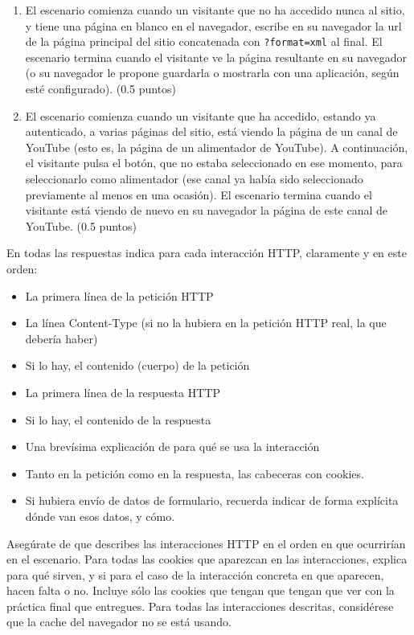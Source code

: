 \begin{enumerate}
\begin{enumerate}
  \item El escenario comienza cuando un visitante que no ha accedido nunca al sitio, y tiene una página en blanco en el navegador, escribe en su navegador la url de la página principal del sitio concatenada con \verb|?format=xml| al final. El escenario termina cuando el visitante ve la página resultante en su navegador (o su navegador le propone guardarla o mostrarla con una aplicación, según esté configurado). (0.5 puntos)

  \item El escenario comienza cuando un visitante que ha accedido, estando ya autenticado, a varias páginas del sitio, está viendo la página de un canal de YouTube (esto es, la página de un alimentador de YouTube). A continuación, el visitante pulsa el botón, que no estaba seleccionado en ese momento, para seleccionarlo como alimentador (ese canal ya había sido seleccionado previamente al menos en una ocasión). El escenario termina cuando el visitante está viendo de nuevo en su navegador la página de este canal de YouTube. (0.5 puntos)

  \end{enumerate}
  
  En todas las respuestas indica para cada interacción HTTP, claramente y en este orden:

\begin{itemize}
  \item La primera línea de la petición HTTP
  \item La línea Content-Type (si no la hubiera en la petición HTTP real, la que debería haber)
  \item Si lo hay, el contenido (cuerpo) de la petición
  \item La primera línea de la respuesta HTTP
  \item Si lo hay, el contenido de la respuesta
  \item Una brevísima explicación de para qué se usa la interacción
  \item Tanto en la petición como en la respuesta, las cabeceras con cookies.
  \item Si hubiera envío de datos de formulario, recuerda indicar de forma explícita dónde van esos datos, y cómo.
  \end{itemize}

Asegúrate de que describes las interacciones HTTP en el orden en que ocurrirían en el escenario. Para todas las cookies que aparezcan en las interacciones, explica para qué sirven, y si para el caso de la interacción concreta en que aparecen, hacen falta o no. Incluye sólo las cookies que tengan que tengan que ver con la práctica final que entregues. Para todas las interacciones descritas, considérese que la cache del navegador no se está usando.



\end{enumerate}
